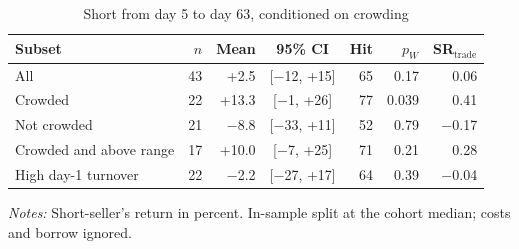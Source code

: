 \begin{table}[!htbp]\centering\footnotesize
\caption{Short from day 5 to day 63, conditioned on crowding}\label{tab:crowdstrat}

\begin{threeparttable}
\begin{tabular}{lrrcrrr}
\toprule
Subset & $n$ & Mean & 95\% CI & Hit & $p_W$ & SR$_\text{trade}$ \\
\midrule
All & 43 & +2.5 & [$-$12, +15] & 65 & 0.17 & 0.06 \\
Crowded & 22 & +13.3 & [$-$1, +26] & 77 & 0.039 & 0.41 \\
Not crowded & 21 & $-$8.8 & [$-$33, +11] & 52 & 0.79 & $-$0.17 \\
Crowded and above range & 17 & +10.0 & [$-$7, +25] & 71 & 0.21 & 0.28 \\
High day-1 turnover & 22 & $-$2.2 & [$-$27, +17] & 64 & 0.39 & $-$0.04 \\
\bottomrule
\end{tabular}
\begin{tablenotes}[flushleft]\footnotesize
\item \textit{Notes:} Short-seller's return in percent. In-sample split at the cohort median; costs and borrow ignored.
\end{tablenotes}
\end{threeparttable}

\end{table}
